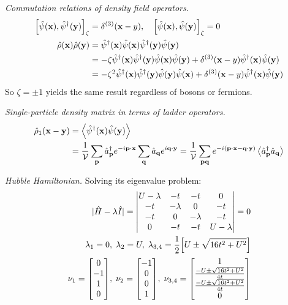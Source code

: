 \documentclass{report}
\begin{document}
\begin{subquests}
	\item \emph{Commutation relations of density field operators.}
	\begin{align*}
		\bqty{\hat{\psi}\pqty{\vb x}, \hat{\psi}^{\dagger}\pqty{\vb y}}_{\zeta} & = \delta^{\pqty{3}}\pqty{\vb x - y},\quad \bqty{\hat{\psi}\pqty{\vb x}, \hat{\psi}\pqty{\vb y}}_{\zeta} = 0 \\
		\hat{\rho}\pqty{\vb x}\hat{\rho}\pqty{\vb y} & = \hat{\psi}^{\dagger}\pqty{\vb x}\hat{\psi}\pqty{\vb x}\hat{\psi}^{\dagger}\pqty{\vb y}\hat{\psi}\pqty{\vb y} \\
		& = -\zeta\hat{\psi}^{\dagger}\pqty{\vb x}\hat{\psi}^{\dagger}\pqty{\vb y}\hat{\psi}\pqty{\vb x}\hat{\psi}\pqty{\vb y} + \delta^{\pqty{3}}\pqty{\vb x - y}\hat{\psi}^{\dagger}\pqty{\vb x}\hat{\psi}\pqty{\vb y} \\
		& = -\zeta^2\hat{\psi}^{\dagger}\pqty{\vb x}\hat{\psi}^{\dagger}\pqty{\vb y}\hat{\psi}\pqty{\vb y}\hat{\psi}\pqty{\vb x} + \delta^{\pqty{3}}\pqty{\vb x - y}\hat{\psi}^{\dagger}\pqty{\vb x}\hat{\psi}\pqty{\vb y}
	\end{align*}
	So $\zeta = \pm 1$ yields the same result regardless of bosons or fermions.

	\item \emph{Single-particle density matrix in terms of ladder operators.}
	\begin{align*}
		\hat{\rho}_1\pqty{\vb x - \vb y} & = \expval{\hat{\psi}^{\dagger}\pqty{\vb x}\hat{\psi}\pqty{\vb y}} \\
		& = \frac{1}{\cal{V}}\sum_{\vb p}\hat{a}_{\vb p}^{\dagger}e^{-i\vb p\cdot \vb x}\sum_{\vb q}\hat{a}_{\vb q}e^{i\vb q\cdot \vb y} = \frac{1}{\cal{V}}\sum_{\vb{pq}}e^{-i\pqty{\vb p\cdot \vb x - \vb q\cdot \vb y}}\expval{\hat{a}_{\vb p}^{\dagger}\hat{a}_{\vb q}}
	\end{align*}

	\item \emph{Hubble Hamiltonian.} Solving its eigenvalue problem:
	\begin{align*}
		|\hat{H} - \lambda\hat{I}| = \mqty|
			U - \lambda & -t & -t & 0 \\
			-t & -\lambda & 0 & -t \\
			-t & 0 & -\lambda & -t \\
			0 & -t & -t & U - \lambda
		| = 0 \\
		\lambda_1 = 0,\;\lambda_2 = U,\;\lambda_{3,4} = \frac{1}{2}\bqty{U \pm \sqrt{16t^2 + U^2}} \\
		\nu_1 = \mqty[0 \\ -1 \\ 1 \\ 0],\; \nu_2 = \mqty[-1 \\ 0 \\ 0 \\ 1],\; \nu_{3,4} = \mqty[1\\ \frac{-U \pm \sqrt{16t^2 + U^2}}{4t} \\ \frac{-U \pm \sqrt{16t^2 + U^2}}{4t} \\ 0]
	\end{align*}
\end{subquests}
\end{document}
